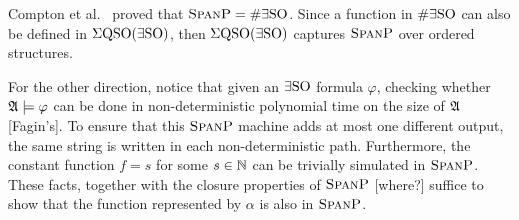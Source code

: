 Compton et al.~\cite{ComptonG96} proved that $\text{\sc SpanP} = \#\exists{\rm SO}$. Since a function in $\#\exists{\rm SO}$ can also be defined in $\Sigma{\rm QSO}(\exists{\rm SO})$, then $\Sigma{\rm QSO}(\exists{\rm SO})$ captures $\text{\sc SpanP}$ over ordered structures.

For the other direction, notice that given an $\exists{\rm SO}$ formula $\varphi$, checking whether $\mathfrak{A}\models\varphi$ can be done in non-deterministic polynomial time on the size of $\mathfrak{A}$ [Fagin's]. To ensure that this $\text{\sc SpanP}$ machine adds at most one different output, the same string is written in each non-deterministic path. Furthermore, the constant function $f = s$ for some $s\in\mathbb{N}$ can be trivially simulated in $\text{\sc SpanP}$. These facts, together with the closure properties of $\text{\sc SpanP}$ [where?] suffice to show that the function represented by $\alpha$ is also in $\text{\sc SpanP}$.

